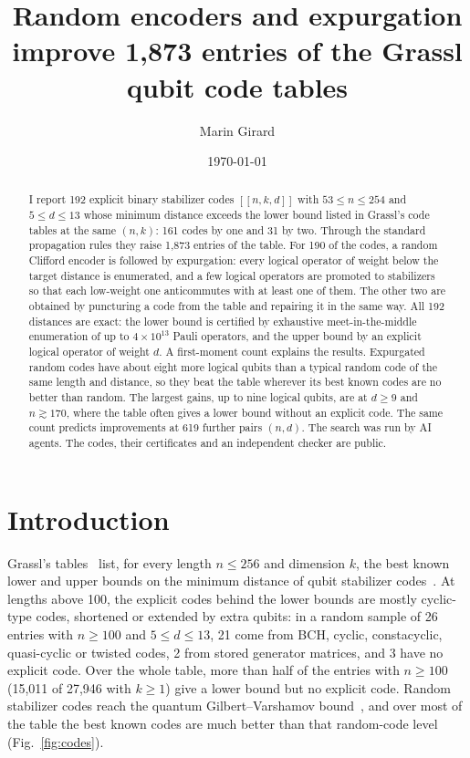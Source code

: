 \documentclass[reprint,pra,superscriptaddress,nofootinbib]{revtex4-2}
\begin{document}
\title{Random encoders and expurgation improve 1,873 entries of the Grassl qubit code tables}

\author{Marin Girard}

\date{\today}

\begin{abstract}
I report 192 explicit binary stabilizer codes $[[n,k,d]]$ with $53\le n\le 254$ and $5\le d\le 13$ whose minimum distance exceeds the lower bound listed in Grassl's code tables at the same $(n,k)$: 161 codes by one and 31 by two. Through the standard propagation rules they raise 1,873 entries of the table. For 190 of the codes, a random Clifford encoder is followed by expurgation: every logical operator of weight below the target distance is enumerated, and a few logical operators are promoted to stabilizers so that each low-weight one anticommutes with at least one of them. The other two are obtained by puncturing a code from the table and repairing it in the same way. All 192 distances are exact: the lower bound is certified by exhaustive meet-in-the-middle enumeration of up to $4\times10^{13}$ Pauli operators, and the upper bound by an explicit logical operator of weight $d$. A first-moment count explains the results. Expurgated random codes have about eight more logical qubits than a typical random code of the same length and distance, so they beat the table wherever its best known codes are no better than random. The largest gains, up to nine logical qubits, are at $d\ge9$ and $n\gtrsim170$, where the table often gives a lower bound without an explicit code. The same count predicts improvements at 619 further pairs $(n,d)$. The search was run by AI agents. The codes, their certificates and an independent checker are public.
\end{abstract}

\maketitle

\section{Introduction}

Grassl's tables~\cite{grassl} list, for every length $n\le 256$ and dimension $k$, the best known lower and upper bounds
on the minimum distance of qubit stabilizer codes~\cite{gottesman,crss}. At lengths above 100, the explicit codes
behind the lower bounds are mostly cyclic-type codes, shortened or extended by extra qubits: in a random sample of 26
entries with $n\ge100$ and $5\le d\le13$, 21 come from BCH, cyclic, constacyclic, quasi-cyclic or twisted codes, 2 from
stored generator matrices, and 3 have no explicit code. Over the whole table, more than half of the entries with
$n\ge100$ (15,011 of 27,946 with $k\ge1$) give a lower bound but no explicit code. Random stabilizer codes reach the
quantum Gilbert--Varshamov bound~\cite{fengma}, and over most of the table the best known codes are much better than
that random-code level (Fig.~\ref{fig:codes}).
\end{document}
